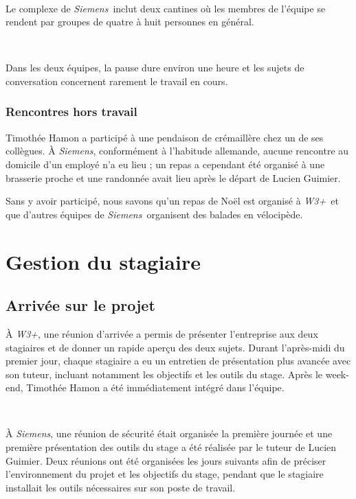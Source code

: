 \documentclass[a4paper, oneside, 12pt]{article}
\def\www{\emph{W3+}}
\def\siemens{\emph{Siemens}}
\begin{document}
\ 

Le complexe de \siemens\ inclut deux cantines où les membres de l’équipe se rendent par groupes de quatre à huit personnes en général.

\ 

Dans les deux équipes, la pause dure environ une heure et les sujets de conversation concernent rarement le travail en cours.

\subsubsection{Rencontres hors travail}

Timothée {\sc Hamon} a participé à une pendaison de crémaillère chez un de ses collègues. À \siemens, conformément à l’habitude allemande, aucune rencontre au domicile d’un employé n’a eu lieu ; un repas a cependant été organisé à une brasserie proche et une randonnée avait lieu après le départ de Lucien {\sc Guimier}.

Sans y avoir participé, nous savons qu’un repas de Noël est organisé à \www\ et que d’autres équipes de \siemens\ organisent des balades en vélocipède.

\vfill

\section{Gestion du stagiaire}

\subsection{Arrivée sur le projet}

À \www, une réunion d’arrivée a permis de présenter l’entreprise aux deux stagiaires et de donner un rapide aperçu des deux sujets. Durant l’après-midi du premier jour, chaque stagiaire a eu un entretien de présentation plus avancée avec son tuteur, incluant notamment les objectifs et les outils du stage. Après le week-end, Timothée {\sc Hamon} a été immédiatement intégré dans l’équipe.

\ 

À \siemens, une réunion de sécurité était organisée la première journée et une première présentation des outils du stage a été réalisée par le tuteur de Lucien {\sc Guimier}. Deux réunions ont été organisées les jours suivants afin de préciser l’environnement du projet et les objectifs du stage, pendant que le stagiaire installait les outils nécessaires sur son poste de travail.
\end{document}
